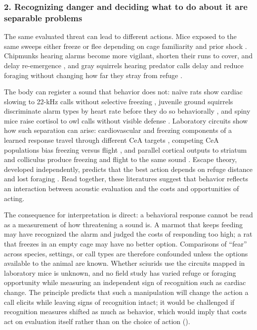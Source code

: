 \subsubsection*{2. Recognizing danger and deciding what to do about it are separable problems}

The same evaluated threat can lead to different actions. Mice exposed to the same sweeps either freeze or flee depending on cage familiarity and prior shock \citep{MongeauEtAl2003}. Chipmunks hearing alarms become more vigilant, shorten their runs to cover, and delay re-emergence \citep{BaackSwitzer2000}, and gray squirrels hearing predator calls delay and reduce foraging without changing how far they stray from refuge \citep{JayneEtAl2015}.

The body can register a sound that behavior does not: naïve rats show cardiac slowing to 22-kHz calls without selective freezing \citep{OlszynskiEtAl2020}, juvenile ground squirrels discriminate alarm types by heart rate before they do so behaviorally \citep{Mateo1996}, and spiny mice raise cortisol to owl calls without visible defense \citep{EilamEtAl1999}. Laboratory circuits show how such separation can arise: cardiovascular and freezing components of a learned response travel through different CeA targets \citep{LeDouxEtAl1988}, competing CeA populations bias freezing versus flight \citep{FadokEtAl2017}, and parallel cortical outputs to striatum and colliculus produce freezing and flight to the same sound \citep{LiEtAl2021}. Escape theory, developed independently, predicts that the best action depends on refuge distance and lost foraging \citep{YdenbergDill1986}. Read together, these literatures suggest that behavior reflects an interaction between acoustic evaluation and the costs and opportunities of acting.

The consequence for interpretation is direct: a behavioral response cannot be read as a measurement of how threatening a sound is. A marmot that keeps feeding may have recognized the alarm and judged the costs of responding too high; a rat that freezes in an empty cage may have no better option. Comparisons of ``fear'' across species, settings, or call types are therefore confounded unless the options available to the animal are known. Whether sciurids use the circuits mapped in laboratory mice is unknown, and no field study has varied refuge or foraging opportunity while measuring an independent sign of recognition such as cardiac change. The principle predicts that such a manipulation will change the action a call elicits while leaving signs of recognition intact; it would be challenged if recognition measures shifted as much as behavior, which would imply that costs act on evaluation itself rather than on the choice of action ().


